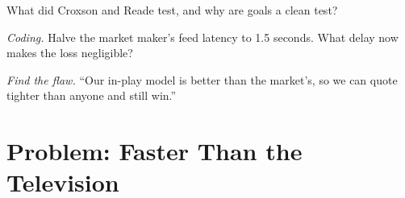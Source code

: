 \begin{exercise}[$\star\star$]\label{exo:hf:prediction-and-sports-market-making:6}
What did Croxson and Reade test, and why are goals a clean test?
\end{exercise}

\begin{exercise}[$\star\star\star$]\label{exo:hf:prediction-and-sports-market-making:7}
\emph{Coding.} Halve the market maker's feed latency to 1.5 seconds. What delay now makes the loss negligible?
\end{exercise}

\begin{exercise}[$\star\star\star$]\label{exo:hf:prediction-and-sports-market-making:8}
\emph{Find the flaw.} ``Our in-play model is better than the market's, so we can quote tighter than anyone and still win.''
\end{exercise}

\section{Problem: Faster Than the Television}


